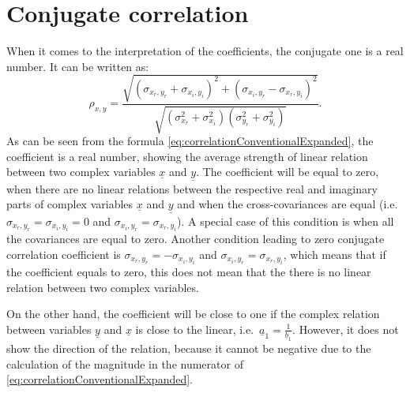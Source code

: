 \documentclass[
]{book}
\begin{document}
\hypertarget{correlationConjugate}{%
\section{Conjugate correlation}\label{correlationConjugate}}

When it comes to the interpretation of the coefficients, the conjugate one is a real number. It can be written as:
\begin{equation}
    {\rho}_{x,y} = \frac{\sqrt{(\sigma_{x_r, y_r} + \sigma_{x_i, y_i})^2 + (\sigma_{x_i, y_r} - \sigma_{x_r, y_i})^2}}{\sqrt{(\sigma_{x_r}^2 + \sigma_{x_i}^2)(\sigma_{y_r}^2 + \sigma_{y_i}^2)}} .
    \label{eq:correlationConventionalExpanded}
\end{equation}
As can be seen from the formula \eqref{eq:correlationConventionalExpanded}, the coefficient is a real number, showing the average strength of linear relation between two complex variables \(\underline{x}\) and \(\underline{y}\). The coefficient will be equal to zero, when there are no linear relations between the respective real and imaginary parts of complex variables \(\underline{x}\) and \(\underline{y}\) and when the cross-covariances are equal (i.e.~\(\sigma_{x_r, y_r}=\sigma_{x_i, y_i}=0\) and \(\sigma_{x_i, y_r} = \sigma_{x_r, y_i}\)). A special case of this condition is when all the covariances are equal to zero. Another condition leading to zero conjugate correlation coefficient is \(\sigma_{x_r, y_r} = - \sigma_{x_i, y_i}\) and \(\sigma_{x_i, y_r} = \sigma_{x_r, y_i}\), which means that if the coefficient equals to zero, this does not mean that the there is no linear relation between two complex variables.

On the other hand, the coefficient will be close to one if the complex relation between variables \(\underline{y}\) and \(\underline{x}\) is close to the linear, i.e.~\(\underline{a}_1 = \frac{1}{\underline{b}_1}\). However, it does not show the direction of the relation, because it cannot be negative due to the calculation of the magnitude in the numerator of \eqref{eq:correlationConventionalExpanded}.
\end{document}
